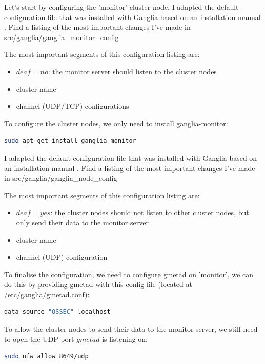 \documentclass[12pt]{report}
\begin{document}
Let's start by configuring the 'monitor' cluster node. I adapted the
default configuration file that was installed with Ganglia based on an
 installation manual \cite{ganglia_install_manual}.
Find a listing of the most important changes I've made in
src/ganglia/ganglia\_monitor\_config

The most important segments of this configuration listing are:
\begin{itemize}
\item $deaf = no$: the monitor server should listen to the cluster
  nodes
\item cluster name
\item channel (UDP/TCP) configurations
\end{itemize}

To configure the cluster nodes, we only need to install ganglia-monitor:
\begin{lstlisting}[language=bash]
sudo apt-get install ganglia-monitor
\end{lstlisting} 

I adapted the
default configuration file that was installed with Ganglia based on an
 installation manual \cite{ganglia_install_manual}.
Find a listing of the most important changes I've made in
src/ganglia/ganglia\_node\_config

The most important segments of this configuration listing are:
\begin{itemize}
\item $deaf = yes$: the cluster nodes should not listen to other
  cluster nodes, but only send their data to the monitor server
\item cluster name
\item channel (UDP) configuration
\end{itemize}

To finalise the configuration, we need to configure gmetad on
'monitor', we can do this by providing gmetad with this config file
(located at /etc/ganglia/gmetad.conf):
\begin{lstlisting}[language=bash]
data_source "OSSEC" localhost
\end{lstlisting} 

To allow the cluster nodes to send their data to the monitor server,
we still need to open the UDP port $gmetad$ is listening on:
 \begin{lstlisting}[language=bash]
sudo ufw allow 8649/udp
\end{lstlisting} 
\end{document}
